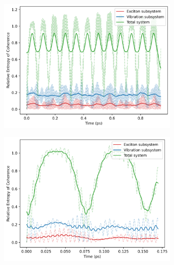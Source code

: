 \documentclass[11pt]{article}
\begin{document}
\begin{figure}[H]
    \centering
    \begin{subfigure}{0.49\textwidth}
        \centering
        \includegraphics[width=\linewidth]{Research Project/Code/results/ExVib/Closed/Envelope/coh.png}
        \caption{}
        \label{fig:EVM_CQS_Coh_env}
    \end{subfigure}
    \hfill
    \begin{subfigure}{0.49\textwidth}
        \centering
        \includegraphics[width=\linewidth]{Research Project/Code/results/ExVib/Closed/Fast/coh.png}
        \caption{}
        \label{fig:EVM_CQS_Coh_fast}
    \end{subfigure}
    
    \caption{}
    \label{fig:EVM_CQS_Coh}
\end{figure}
\end{document}
